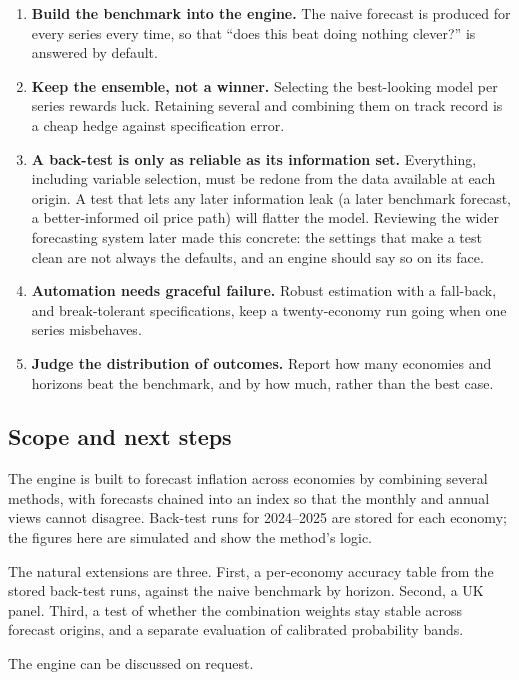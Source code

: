 \documentclass[
  british,
  a4paper,
]{article}
\providecommand{\tightlist}{%
  \setlength{\itemsep}{0pt}\setlength{\parskip}{0pt}}
\begin{document}
\begin{enumerate}
\def\labelenumi{\arabic{enumi}.}
\tightlist
\item
  \textbf{Build the benchmark into the engine.} The naive forecast is
  produced for every series every time, so that ``does this beat doing
  nothing clever?'' is answered by default.
\item
  \textbf{Keep the ensemble, not a winner.} Selecting the best-looking
  model per series rewards luck. Retaining several and combining them on
  track record is a cheap hedge against specification error.
\item
  \textbf{A back-test is only as reliable as its information set.}
  Everything, including variable selection, must be redone from the data
  available at each origin. A test that lets any later information leak
  (a later benchmark forecast, a better-informed oil price path) will
  flatter the model. Reviewing the wider forecasting system later made
  this concrete: the settings that make a test clean are not always the
  defaults, and an engine should say so on its face.
\item
  \textbf{Automation needs graceful failure.} Robust estimation with a
  fall-back, and break-tolerant specifications, keep a twenty-economy
  run going when one series misbehaves.
\item
  \textbf{Judge the distribution of outcomes.} Report how many economies
  and horizons beat the benchmark, and by how much, rather than the best
  case.
\end{enumerate}

\subsection{Scope and next steps}\label{scope-and-next-steps}

The engine is built to forecast inflation across economies by combining
several methods, with forecasts chained into an index so that the
monthly and annual views cannot disagree. Back-test runs for 2024--2025
are stored for each economy; the figures here are simulated and show the
method's logic.

The natural extensions are three. First, a per-economy accuracy table
from the stored back-test runs, against the naive benchmark by horizon.
Second, a UK panel. Third, a test of whether the combination weights
stay stable across forecast origins, and a separate evaluation of
calibrated probability bands.

The engine can be discussed on request.
\end{document}
